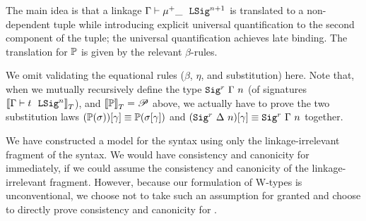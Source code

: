 The main idea is that
a linkage $ {\Gamma} \vdash {\mu^+ \_} \ \ \texttt{LSig}^{n+1} $
is translated to a non-dependent tuple while introducing explicit universal
quantification to the second component of the tuple;
the universal quantification achieves late binding.
The translation for $\mathbb{P}$ is given by the relevant $\beta$-rules.


We omit validating the equational rules ($\beta$, $\eta$, and substitution) here.
Note that, when we mutually recursively define the type
${{ \texttt{Sig}^r_{}~{\Gamma}~{n} }}$ (of signatures ${{\llbracket {\ensuremath{ {\Gamma} \vdash {t} \ \ \texttt{LSig}^{n} }} \rrbracket}_T}$), and
${{\llbracket {\ensuremath{\mathbb{P}}} \rrbracket}_T} = \mathscr{P}$ above, we actually have to prove the two substitution laws
${(\mathbb{P}({\sigma}))}\!\left[{\gamma}\right]\equiv \mathbb{P}({{\sigma}\!\left[{\gamma}\right]})$ and ${({ \texttt{Sig}^r_{}~{\Delta}~{n} })}\!\left[{\gamma}\right]
\equiv {\ensuremath{ \texttt{Sig}^r_{}~{\Gamma}~{n} }}$ together. 


We have constructed a model for the \TT syntax using
only the linkage-irrelevant fragment of the syntax.
%
%
We would have consistency and canonicity for \TT immediately, if we could assume
the consistency and canonicity of the linkage-irrelevant fragment.
However, because our formulation of W-types is unconventional,
we choose not to take such an assumption for granted and choose to directly prove
consistency and canonicity for \TT.


